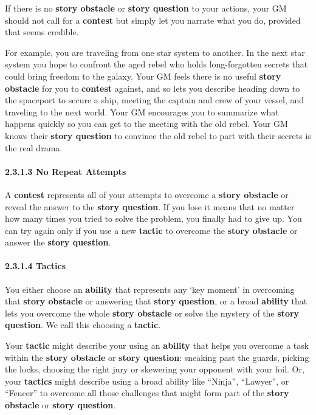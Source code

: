 \documentclass[
  11pt,
]{article}
\begin{document}
If there is no \textbf{story obstacle} or \textbf{story question} to
your actions, your GM should not call for a \textbf{contest} but simply
let you narrate what you do, provided that seems credible.

For example, you are traveling from one star system to another. In the
next star system you hope to confront the aged rebel who holds
long-forgotten secrets that could bring freedom to the galaxy. Your GM
feels there is no useful \textbf{story obstacle} for you to
\textbf{contest} against, and so lets you describe heading down to the
spaceport to secure a ship, meeting the captain and crew of your vessel,
and traveling to the next world. Your GM encourages you to summarize
what happens quickly so you can get to the meeting with the old rebel.
Your GM knows their \textbf{story question} to convince the old rebel to
part with their secrets is the real drama.

\hypertarget{no-repeat-attempts}{%
\paragraph{2.3.1.3 No Repeat Attempts}\label{no-repeat-attempts}}

A \textbf{contest} represents all of your attempts to overcome a
\textbf{story obstacle} or reveal the answer to the \textbf{story
question}. If you lose it means that no matter how many times you tried
to solve the problem, you finally had to give up. You can try again only
if you use a new \textbf{tactic} to overcome the \textbf{story obstacle}
or answer the \textbf{story question}.

\hypertarget{tactics}{%
\paragraph{2.3.1.4 Tactics}\label{tactics}}

You either choose an \textbf{ability} that represents any `key moment'
in overcoming that \textbf{story obstacle} or answering that
\textbf{story question}, or a broad \textbf{ability} that lets you
overcome the whole \textbf{story obstacle} or solve the mystery of the
\textbf{story question}. We call this choosing a \textbf{tactic}.

Your \textbf{tactic} might describe your using an \textbf{ability} that
helps you overcome a task within the \textbf{story obstacle} or
\textbf{story question}: sneaking past the guards, picking the locks,
choosing the right jury or skewering your opponent with your foil. Or,
your \textbf{tactics} might describe using a broad ability like
``Ninja'', ``Lawyer'', or ``Fencer'' to overcome all those challenges
that might form part of the \textbf{story obstacle} or \textbf{story
question}.
\end{document}
